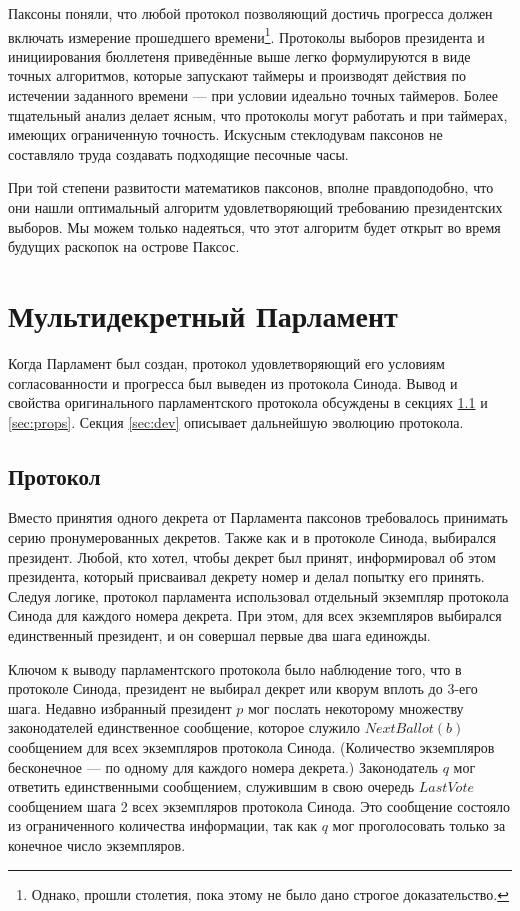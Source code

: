 \documentclass[12pt, a4paper]{article} %
\begin{document}
Паксоны поняли, что любой протокол позволяющий достичь прогресса должен включать измерение прошедшего времени\footnote{Однако, прошли столетия, пока этому не было дано строгое доказательство.}. Протоколы выборов президента и инициирования бюллетеня приведённые выше легко формулируются в виде точных алгоритмов, которые запускают таймеры и производят действия по истечении заданного времени --- при условии идеально точных таймеров. Более тщательный анализ делает ясным, что протоколы могут работать и при таймерах, имеющих ограниченную точность. Искусным стеклодувам паксонов не составляло труда создавать подходящие песочные часы. 

При той степени развитости математиков паксонов, вполне правдоподобно, что они нашли оптимальный алгоритм удовлетворяющий требованию президентских выборов. Мы можем только надеяться, что этот алгоритм будет открыт во время будущих раскопок на острове Паксос.

\newpage
\section{Мультидекретный Парламент}\label{sec:parlamentprot}

Когда Парламент был создан, протокол удовлетворяющий его условиям согласованности и прогресса был выведен из протокола Синода. Вывод и свойства оригинального парламентского протокола обсуждены в секциях \ref{sec:protocol} и \ref{sec:props}. Секция \ref{sec:dev} описывает дальнейшую эволюцию протокола.

\subsection{Протокол}\label{sec:protocol}

Вместо принятия одного декрета от Парламента паксонов требовалось принимать серию пронумерованных декретов. Также как и в протоколе Синода, выбирался президент. Любой, кто хотел, чтобы декрет был принят, информировал об этом президента, который присваивал декрету номер и делал попытку его принять. Следуя логике, протокол парламента использовал отдельный экземпляр протокола Синода для каждого номера декрета. При этом, для всех экземпляров выбирался единственный президент, и он совершал первые два шага единожды.

Ключом к выводу парламентского протокола было наблюдение того, что в протоколе Синода, президент не выбирал декрет или кворум вплоть до 3-его шага. Недавно избранный президент $p$ мог послать некоторому множеству законодателей единственное сообщение, которое служило $NextBallot(b)$ сообщением для всех экземпляров протокола Синода. (Количество экземпляров бесконечное --- по одному для каждого номера декрета.) Законодатель $q$ мог ответить единственными сообщением, служившим в свою очередь $LastVote$ сообщением шага 2 всех экземпляров протокола Синода. Это сообщение состояло из ограниченного количества информации, так как $q$ мог проголосовать только за конечное число экземпляров.
\end{document}
